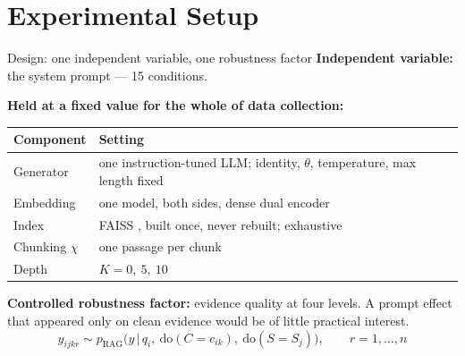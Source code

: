 \documentclass[11pt,aspectratio=169]{beamer}
\begin{document}
\section{Experimental Setup}

\begin{frame}{Design: one independent variable, one robustness factor}
  \textbf{Independent variable:} the system prompt --- 15 conditions.
  \medskip

  \textbf{Held at a fixed value for the whole of data collection:}
  \begin{center}\small
  \begin{tabular}{@{}ll@{}}
    \toprule
    Component & Setting \\
    \midrule
    Generator & one instruction-tuned LLM; identity, $\theta$, temperature, max length fixed \\
    Embedding & one model, both sides, dense dual encoder \citep{karpukhin2020dpr} \\
    Index & FAISS \citep{johnson2021faiss}, built once, never rebuilt; exhaustive \\
    Chunking $\chi$ & one passage per chunk \\
    Depth & $K = 0,\ 5,\ 10$ \\
    \bottomrule
  \end{tabular}
  \end{center}
  \medskip
  \textbf{Controlled robustness factor:} evidence
  quality at four levels. A prompt effect that appeared only on clean evidence
  would be of little practical interest.
  \begin{equation*}
    y_{ijkr} \sim p_{\mathrm{RAG}}\bigl(y \,\big|\, q_i,\ \mathrm{do}(C=c_{ik}),\ \mathrm{do}(S=S_j)\bigr),
    \qquad r=1,\ldots,n
  \end{equation*}
\end{frame}
\end{document}
